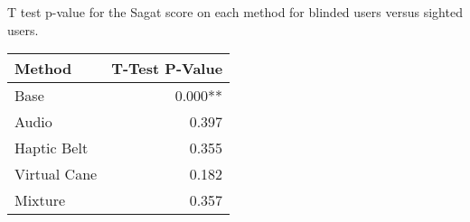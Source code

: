 
\centering
\caption{T test p-value for the Sagat score on each method for blinded users versus sighted users.}
\label{tab:ttest_sagat_score}
\begin{tabular}{lr}
\toprule
      Method & T-Test P-Value \\
\midrule
        Base &        0.000** \\
       Audio &          0.397 \\
 Haptic Belt &          0.355 \\
Virtual Cane &          0.182 \\
     Mixture &          0.357 \\
\bottomrule
\end{tabular}
